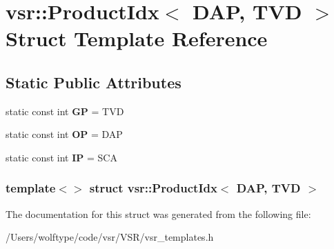 \hypertarget{structvsr_1_1_product_idx_3_01_d_a_p_00_01_t_v_d_01_4}{\section{vsr\-:\-:Product\-Idx$<$ D\-A\-P, T\-V\-D $>$ Struct Template Reference}
\label{structvsr_1_1_product_idx_3_01_d_a_p_00_01_t_v_d_01_4}
}
\subsection*{Static Public Attributes}
\begin{DoxyCompactItemize}
\item 
\hypertarget{structvsr_1_1_product_idx_3_01_d_a_p_00_01_t_v_d_01_4_ad7fd0b189b88d86153be1f2283f1d64c}{static const int {\bfseries G\-P} = T\-V\-D}\label{structvsr_1_1_product_idx_3_01_d_a_p_00_01_t_v_d_01_4_ad7fd0b189b88d86153be1f2283f1d64c}

\item 
\hypertarget{structvsr_1_1_product_idx_3_01_d_a_p_00_01_t_v_d_01_4_aea36a4fc81b0bdd2998545fa13b08db1}{static const int {\bfseries O\-P} = D\-A\-P}\label{structvsr_1_1_product_idx_3_01_d_a_p_00_01_t_v_d_01_4_aea36a4fc81b0bdd2998545fa13b08db1}

\item 
\hypertarget{structvsr_1_1_product_idx_3_01_d_a_p_00_01_t_v_d_01_4_ad42f3031f90d76f7f28c60c63ebfc580}{static const int {\bfseries I\-P} = S\-C\-A}\label{structvsr_1_1_product_idx_3_01_d_a_p_00_01_t_v_d_01_4_ad42f3031f90d76f7f28c60c63ebfc580}

\end{DoxyCompactItemize}
\subsubsection*{template$<$$>$ struct vsr\-::\-Product\-Idx$<$ D\-A\-P, T\-V\-D $>$}



The documentation for this struct was generated from the following file\-:\begin{DoxyCompactItemize}
\item 
/\-Users/wolftype/code/vsr/\-V\-S\-R/vsr\-\_\-templates.\-h\end{DoxyCompactItemize}
